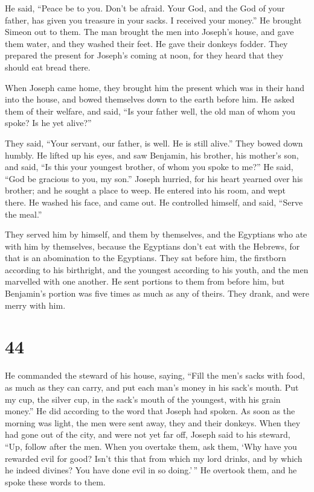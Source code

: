  He said, ``Peace be to you. Don't be afraid. Your God,
and the God of your father, has given you treasure in your sacks. I
received your money.'' He brought Simeon out to them. 
The man brought the men into Joseph's house, and gave them water, and
they washed their feet. He gave their donkeys fodder. 
They prepared the present for Joseph's coming at noon, for they heard
that they should eat bread there.

 When Joseph came home, they brought him the present
which was in their hand into the house, and bowed themselves down to the
earth before him.  He asked them of their welfare, and
said, ``Is your father well, the old man of whom you spoke? Is he yet
alive?''

 They said, ``Your servant, our father, is well. He is
still alive.'' They bowed down humbly.  He lifted up his
eyes, and saw Benjamin, his brother, his mother's son, and said, ``Is
this your youngest brother, of whom you spoke to me?'' He said, ``God be
gracious to you, my son.''  Joseph hurried, for his heart
yearned over his brother; and he sought a place to weep. He entered into
his room, and wept there.  He washed his face, and came
out. He controlled himself, and said, ``Serve the meal.''

 They served him by himself, and them by themselves, and
the Egyptians who ate with him by themselves, because the Egyptians
don't eat with the Hebrews, for that is an abomination to the Egyptians.
 They sat before him, the firstborn according to his
birthright, and the youngest according to his youth, and the men
marvelled with one another.  He sent portions to them
from before him, but Benjamin's portion was five times as much as any of
theirs. They drank, and were merry with him.

\hypertarget{section-43}{%
\section{44}\label{section-43}}

 He commanded the steward of his house, saying, ``Fill the
men's sacks with food, as much as they can carry, and put each man's
money in his sack's mouth.  Put my cup, the silver cup, in
the sack's mouth of the youngest, with his grain money.'' He did
according to the word that Joseph had spoken.  As soon as
the morning was light, the men were sent away, they and their donkeys.
 When they had gone out of the city, and were not yet far
off, Joseph said to his steward, ``Up, follow after the men. When you
overtake them, ask them, `Why have you rewarded evil for good?
 Isn't this that from which my lord drinks, and by which
he indeed divines? You have done evil in so doing.'\,'' 
He overtook them, and he spoke these words to them.

